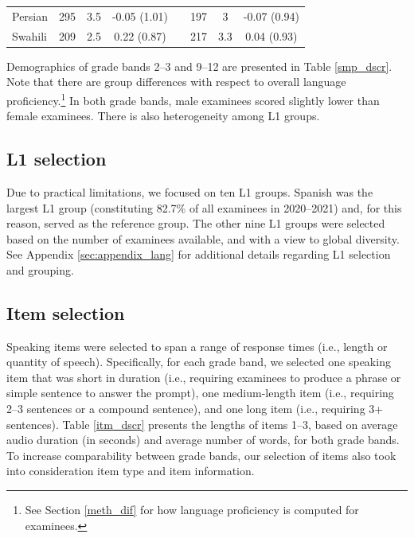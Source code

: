 \documentclass [PhD] {uclathes}
\begin{document}
\begin{table}[htbp]
\begin{tabular}{lccccccc}
    \hspace{3mm} Persian & 295 & 3.5 & -0.05 (1.01) & & 197 & 3 & -0.07 (0.94) \\
    \hspace{3mm} Swahili & 209 & 2.5 & 0.22 (0.87) & & 217 & 3.3 & 0.04 (0.93) \\
    \bottomrule
    \end{tabular}
\end{table}

Demographics of grade bands 2–3 and 9–12 are presented in Table \ref{smp_dscr}. Note that there are group differences with respect to overall language proficiency.\footnote{See Section \ref{meth_dif} for how language proficiency is computed for examinees.} In both grade bands, male examinees scored slightly lower than female examinees. There is also heterogeneity among L1 groups.

\subsection{L1 selection}

Due to practical limitations, we focused on ten L1 groups. Spanish was the largest L1 group (constituting 82.7\% of all examinees in 2020–2021) and, for this reason, served as the reference group. The other nine L1 groups were selected based on the number of examinees available, and with a view to global diversity. See Appendix \ref{sec:appendix_lang} for additional details regarding L1 selection and grouping.

\subsection{Item selection}

Speaking items were selected to span a range of response times (i.e., length or quantity of speech). Specifically, for each grade band, we selected one speaking item that was short in duration (i.e., requiring examinees to produce a phrase or simple sentence to answer the prompt), one medium-length item (i.e., requiring 2–3 sentences or a compound sentence), and one long item (i.e., requiring 3+ sentences). Table \ref{itm_dscr} presents the lengths of items 1–3, based on average audio duration (in seconds) and average number of words, for both grade bands. To increase comparability between grade bands, our selection of items also took into consideration item type and item information.
\end{document}
